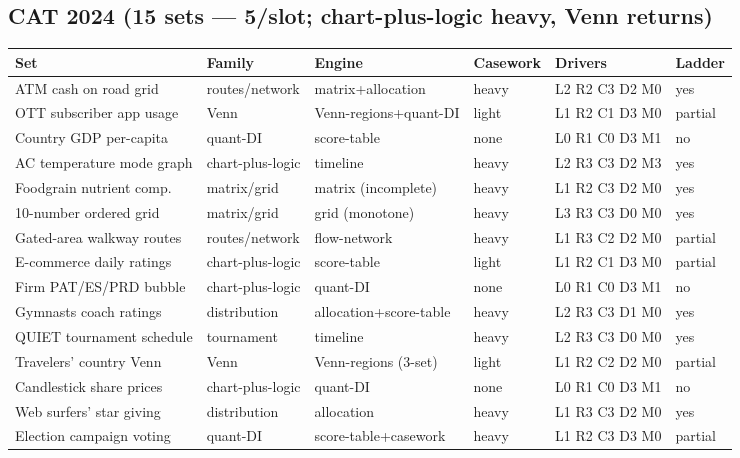 \documentclass[11pt,a4paper]{article}
\newcommand{\invtab}{\footnotesize}
\begin{document}
\subsection{CAT 2024 (15 sets --- 5/slot; chart-plus-logic heavy, Venn returns)}
{\invtab
\begin{longtable}{p{3.0cm}p{2.05cm}p{2.5cm}p{1.2cm}p{2.05cm}p{1.7cm}}
\toprule
\textbf{Set} & \textbf{Family} & \textbf{Engine} & \textbf{Casework} & \textbf{Drivers} & \textbf{Ladder} \\
\midrule
\endhead
ATM cash on road grid & routes/network & matrix+allocation & heavy & L2 R2 C3 D2 M0 & yes \\
OTT subscriber app usage & Venn & Venn-regions+quant-DI & light & L1 R2 C1 D3 M0 & partial \\
Country GDP per-capita & quant-DI & score-table & none & L0 R1 C0 D3 M1 & no \\
AC temperature mode graph & chart-plus-logic & timeline & heavy & L2 R3 C3 D2 M3 & yes \\
Foodgrain nutrient comp. & matrix/grid & matrix (incomplete) & heavy & L1 R2 C3 D2 M0 & yes \\
10-number ordered grid & matrix/grid & grid (monotone) & heavy & L3 R3 C3 D0 M0 & yes \\
Gated-area walkway routes & routes/network & flow-network & heavy & L1 R3 C2 D2 M0 & partial \\
E-commerce daily ratings & chart-plus-logic & score-table & light & L1 R2 C1 D3 M0 & partial \\
Firm PAT/ES/PRD bubble & chart-plus-logic & quant-DI & none & L0 R1 C0 D3 M1 & no \\
Gymnasts coach ratings & distribution & allocation+score-table & heavy & L2 R3 C3 D1 M0 & yes \\
QUIET tournament schedule & tournament & timeline & heavy & L2 R3 C3 D0 M0 & yes \\
Travelers' country Venn & Venn & Venn-regions (3-set) & light & L1 R2 C2 D2 M0 & partial \\
Candlestick share prices & chart-plus-logic & quant-DI & none & L0 R1 C0 D3 M1 & no \\
Web surfers' star giving & distribution & allocation & heavy & L1 R3 C3 D2 M0 & yes \\
Election campaign voting & quant-DI & score-table+casework & heavy & L1 R2 C3 D3 M0 & partial \\
\bottomrule
\end{longtable}}
\end{document}
